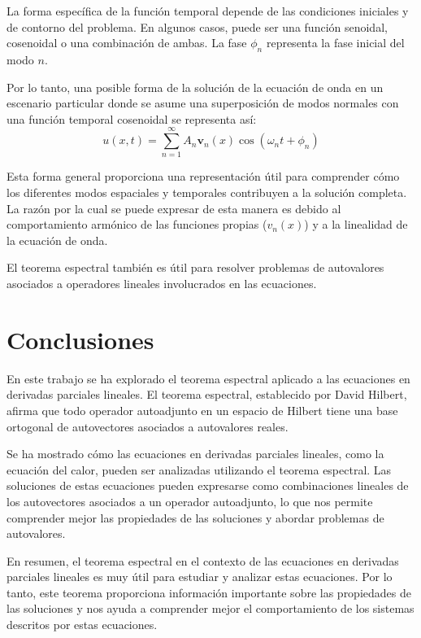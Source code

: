 \documentclass{article}
\begin{document}
    La forma específica de la función temporal depende de las condiciones iniciales y de contorno del problema. En algunos casos, puede ser una función senoidal, cosenoidal o una combinación de ambas. La fase $\phi_n$ representa la fase inicial del modo $n$.

    Por lo tanto, una posible forma de la solución de la ecuación de onda en un escenario particular donde se asume una superposición de modos normales con una función temporal cosenoidal se representa así: 
    \begin{equation} 
        u(x, t) = \sum_{n=1}^{\infty} A_n \mathbf{v}_n(x) \cos(\omega_n t + \phi_n) 
    \end{equation} 
    
    Esta forma general proporciona una representación útil para comprender cómo los diferentes modos espaciales y temporales contribuyen a la solución completa. La razón por la cual se puede expresar de esta manera es debido al comportamiento armónico de las funciones propias ($v_n(x)$) y a la linealidad de la ecuación de onda.

    El teorema espectral también es útil para resolver problemas de autovalores asociados a operadores lineales involucrados en las ecuaciones.

\newpage

\section{Conclusiones}

En este trabajo se ha explorado el teorema espectral aplicado a las ecuaciones en derivadas parciales lineales. El teorema espectral, establecido por David Hilbert, afirma que todo operador autoadjunto en un espacio de Hilbert tiene una base ortogonal de autovectores asociados a autovalores reales.

Se ha mostrado cómo las ecuaciones en derivadas parciales lineales, como la ecuación del calor, pueden ser analizadas utilizando el teorema espectral. Las soluciones de estas ecuaciones pueden expresarse como combinaciones lineales de los autovectores asociados a un operador autoadjunto, lo que nos permite comprender mejor las propiedades de las soluciones y abordar problemas de autovalores.

En resumen, el teorema espectral en el contexto de las ecuaciones en derivadas parciales lineales es muy útil para estudiar y analizar estas ecuaciones. Por lo tanto, este teorema proporciona información importante sobre las propiedades de las soluciones y nos ayuda a comprender mejor el comportamiento de los sistemas descritos por estas ecuaciones.
\end{document}
